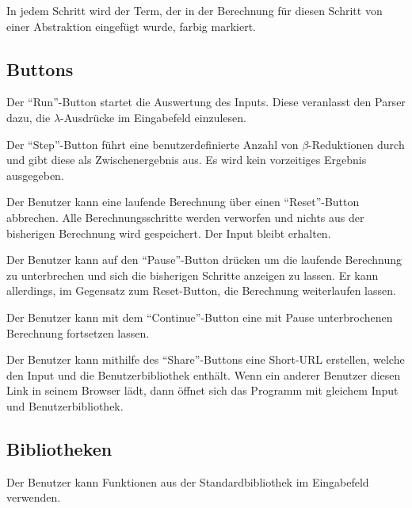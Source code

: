 \documentclass[parskip=full,11pt,twoside]{scrartcl}
\begin{document}
In jedem Schritt wird der Term, der in der Berechnung für diesen Schritt von einer Abstraktion eingefügt wurde, farbig markiert.


\subsection{Buttons}

Der \enquote{Run}-Button startet die Auswertung des Inputs. Diese veranlasst den Parser dazu, die $\lambda$-Ausdrücke im Eingabefeld einzulesen.

Der \enquote {Step}-Button führt eine benutzerdefinierte Anzahl von $\beta$-Reduktionen durch und gibt diese als Zwischenergebnis aus. Es wird kein vorzeitiges Ergebnis ausgegeben.

Der Benutzer kann eine laufende Berechnung über einen \enquote{Reset}-Button abbrechen. Alle Berechnungsschritte werden verworfen und nichts aus der bisherigen Berechnung wird gespeichert. Der Input bleibt erhalten.

Der Benutzer kann auf den \enquote{Pause}-Button drücken um die laufende Berechnung zu unterbrechen und sich die bisherigen Schritte anzeigen zu lassen. Er kann allerdings, im Gegensatz zum Reset-Button, die Berechnung weiterlaufen lassen.

Der Benutzer kann mit dem \enquote{Continue}-Button eine mit Pause unterbrochenen Berechnung fortsetzen lassen.

Der Benutzer kann mithilfe des \enquote{Share}-Buttons eine Short-URL erstellen, welche den Input und die Benutzerbibliothek enthält. Wenn ein anderer Benutzer diesen Link in seinem Browser lädt, dann öffnet sich das Programm mit gleichem Input und Benutzerbibliothek.

\subsection{Bibliotheken}

Der Benutzer kann Funktionen aus der Standardbibliothek im Eingabefeld verwenden.
\end{document}
